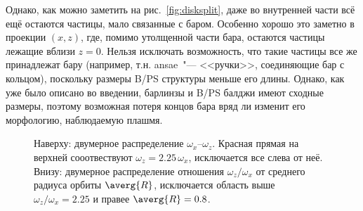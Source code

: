 \documentclass[tikz]{trlnotes}
\begin{document}
Однако, как можно заметить на рис.~\ref{fig:disksplit}, даже во внутренней части всё ещё остаются частицы, мало
связанные с баром. Особенно хорошо это заметно в проекции $(x, z)$, где, помимо утолщенной части бара, остаются
частицы лежащие вблизи $z=0$. Нельзя исключать возможность, что такие частицы все же принадлежат бару (например, т.н.
ansae~"--- <<ручки>>, соединяющие бар с кольцом), поскольку размеры B/PS структуры меньше его длины. Однако, как
уже было описано во введении, барлинзы и B/PS балджи имеют сходные размеры, поэтому возможная потеря концов бара
вряд ли изменит его морфологию, наблюдаемую плашмя. 

\begin{figure}[htpb]
  \centering
  \caption{Наверху: двумерное распределение $ω_x$--$ω_z$. Красная прямая на верхней сооотвествуют $ω_z = 2.25\,
    ω_x$, исключается все слева от неё. Внизу: двумерное распределение отношения $ω_z/ω_x$ от среднего радиуса
  орбиты $\averg{R}$, исключается область выше $ω_z/ω_x = 2.25$ и правее $\averg{R} = 0.8$.}
  \label{fig:innerrefine}
\end{figure}
\end{document}
